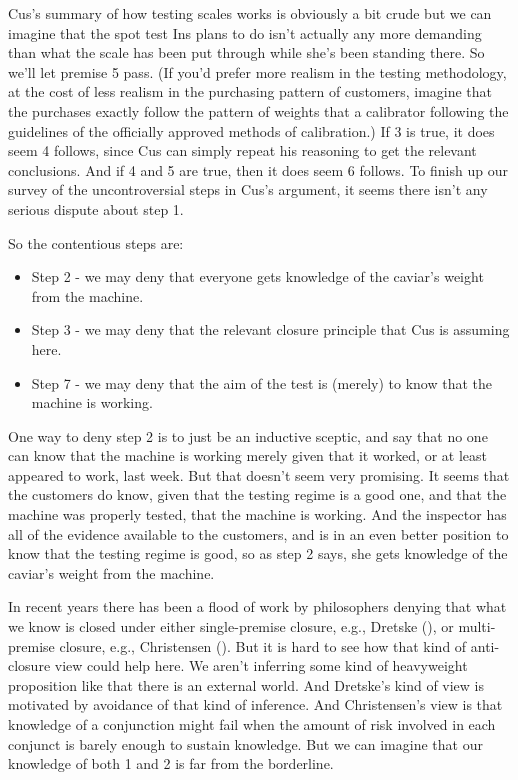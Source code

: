 \documentclass[
  10pt,
  letterpaper,
  twoside]{scrbook}
\providecommand{\tightlist}{%
  \setlength{\itemsep}{0pt}\setlength{\parskip}{0pt}}\usepackage{longtable,booktabs,array}
\begin{document}
{Cus}'s summary of how testing scales works is obviously a bit crude but
we can imagine that the spot test {Ins} plans to do isn't actually any
more demanding than what the scale has been put through while she's been
standing there. So we'll let premise 5 pass. (If you'd prefer more
realism in the testing methodology, at the cost of less realism in the
purchasing pattern of customers, imagine that the purchases exactly
follow the pattern of weights that a calibrator following the guidelines
of the officially approved methods of calibration.) If 3 is true, it
does seem 4 follows, since {Cus} can simply repeat his reasoning to get
the relevant conclusions. And if 4 and 5 are true, then it does seem 6
follows. To finish up our survey of the uncontroversial steps in {Cus}'s
argument, it seems there isn't any serious dispute about step 1.

So the contentious steps are:

\begin{itemize}
\tightlist
\item
  Step 2 - we may deny that everyone gets knowledge of the caviar's
  weight from the machine.
\item
  Step 3 - we may deny that the relevant closure principle that {Cus} is
  assuming here.
\item
  Step 7 - we may deny that the aim of the test is (merely) to know that
  the machine is working.
\end{itemize}

One way to deny step 2 is to just be an inductive sceptic, and say that
no one can know that the machine is working merely given that it worked,
or at least appeared to work, last week. But that doesn't seem very
promising. It seems that the customers do know, given that the testing
regime is a good one, and that the machine was properly tested, that the
machine is working. And the inspector has all of the evidence available
to the customers, and is in an even better position to know that the
testing regime is good, so as step 2 says, she gets knowledge of the
caviar's weight from the machine.

In recent years there has been a flood of work by philosophers denying
that what we know is closed under either single-premise closure, e.g.,
Dretske (), or multi-premise closure,
e.g., Christensen (). But it is hard
to see how that kind of anti-closure view could help here. We aren't
inferring some kind of heavyweight proposition like that there is an
external world. And Dretske's kind of view is motivated by avoidance of
that kind of inference. And Christensen's view is that knowledge of a
conjunction might fail when the amount of risk involved in each conjunct
is barely enough to sustain knowledge. But we can imagine that our
knowledge of both 1 and 2 is far from the borderline.
\end{document}
